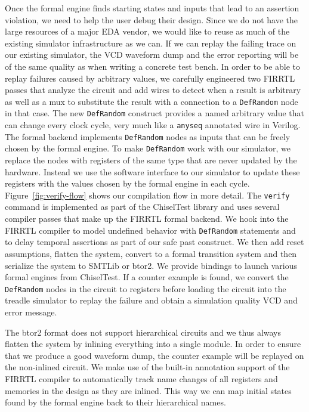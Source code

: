 \documentclass[conference]{IEEEtran}
\newcommand{\code}[1]{{\small{\texttt{#1}}}}
\begin{document}
Once the formal engine finds starting states and inputs that lead to an assertion violation, we need to help the user debug their design.
Since we do not have the large resources of a major EDA vendor, we would like to reuse as much of the existing simulator infrastructure as we can.
If we can replay the failing trace on our existing simulator, the VCD waveform dump and the error reporting will be of the same quality as
when writing a concrete test bench.
In order to be able to replay failures caused by arbitrary values, we carefully engineered two FIRRTL passes that analyze the circuit and
add wires to detect when a result is arbitrary as well as a mux to substitute the result with a connection to a \code{DefRandom} node in that case.
The new \code{DefRandom} construct provides a named arbitrary value that can change every clock cycle,
very much like a \code{anyseq} annotated wire in Verilog.
The formal backend implements \code{DefRandom} nodes as inputs that can be freely chosen by the formal engine.
To make \code{DefRandom} work with our simulator, we  replace the nodes with registers of the same type that are never updated by the hardware.
Instead we use the software interface to our simulator to update these registers with the values chosen by the formal engine in each cycle.
Figure~\ref{fig:verify-flow} shows our compilation flow in more detail.
The \code{verify} command is implemented as part of the ChiselTest library and uses several compiler passes that make up the FIRRTL formal backend.
We hook into the FIRRTL compiler to model undefined behavior with \code{DefRandom} statements and to delay temporal assertions as part of our safe past construct.
We then add reset assumptions, flatten the system, convert to a formal transition system and then serialize the system to SMTLib or btor2.
We provide bindings to launch various formal engines from ChiselTest.
If a counter example is found, we convert the \code{DefRandom} nodes in the circuit to registers before loading the circuit into the treadle simulator
to replay the failure and obtain a simulation quality VCD and error message.

The btor2 format does not support hierarchical circuits and we thus always flatten the system by inlining everything into a single module.
In order to ensure that we produce a good waveform dump, the counter example will be replayed on the non-inlined circuit.
We make use of the built-in annotation support of the FIRRTL compiler to automatically track name changes of all registers and memories in
the design as they are inlined. This way we can map initial states found by the formal engine back to their hierarchical names.
\end{document}
